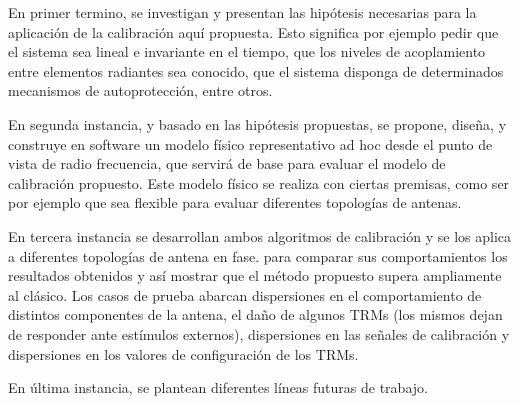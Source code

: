 \documentclass[11pt, oneside]{Thesis} %
\begin{document}
{En primer termino, se investigan y presentan las hipótesis necesarias para la aplicación de la calibración aquí propuesta. 
Esto significa por ejemplo pedir que el sistema sea lineal e invariante en el tiempo, que los niveles de acoplamiento entre 
elementos radiantes sea conocido, que el sistema disponga de determinados mecanismos de autoprotección, entre otros.

En segunda instancia, y basado en las hipótesis propuestas, se propone, diseña, y construye en software un modelo físico 
representativo ad hoc desde el punto de vista de radio frecuencia, que servirá de base para evaluar el modelo de calibración 
propuesto. Este modelo físico se realiza con ciertas premisas, como ser por ejemplo que sea flexible para evaluar diferentes 
topologías de antenas.

En tercera instancia se desarrollan ambos algoritmos de calibración y se los aplica a diferentes topologías de antena en fase. 
para comparar sus comportamientos los resultados obtenidos y así mostrar que el método propuesto supera ampliamente al
clásico. Los casos de prueba abarcan dispersiones en el comportamiento de distintos componentes de la antena, el daño de
algunos TRMs (los mismos dejan de responder ante estímulos externos), dispersiones en las señales de calibración y
dispersiones en los valores de configuración de los TRMs. 

En última instancia, se plantean diferentes líneas futuras de trabajo.
}

\clearpage %



\clearpage %
\end{document}
